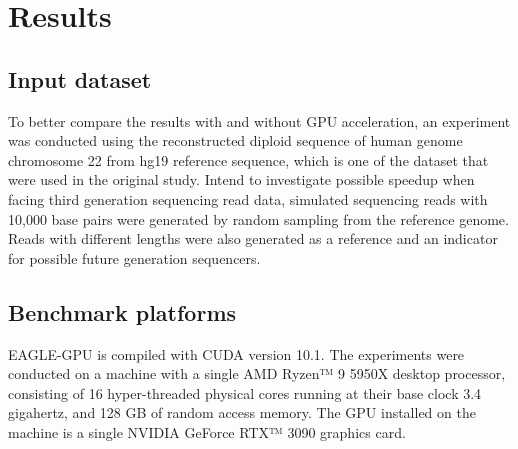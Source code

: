 \documentclass{PHlab-thesis}
\begin{document}
\chapter{Results}
\section{Input dataset}
To better compare the results with and without GPU acceleration, an experiment was conducted using the reconstructed diploid sequence of human genome chromosome 22 from hg19 reference sequence, which is one of the dataset that were used in the original study. Intend to investigate possible speedup when facing third generation sequencing read data, simulated sequencing reads with 10,000 base pairs were generated by random sampling from the reference genome. Reads with different lengths were also generated as a reference and an indicator for possible future generation sequencers.

\section{Benchmark platforms}
EAGLE-GPU is compiled with CUDA version 10.1. The experiments were conducted on a machine with a single AMD Ryzen™ 9 5950X desktop processor, consisting of 16 hyper-threaded physical cores running at their base clock 3.4 gigahertz, and 128 GB of random access memory. The GPU installed on the machine is a single NVIDIA GeForce RTX™ 3090 graphics card.
\end{document}
